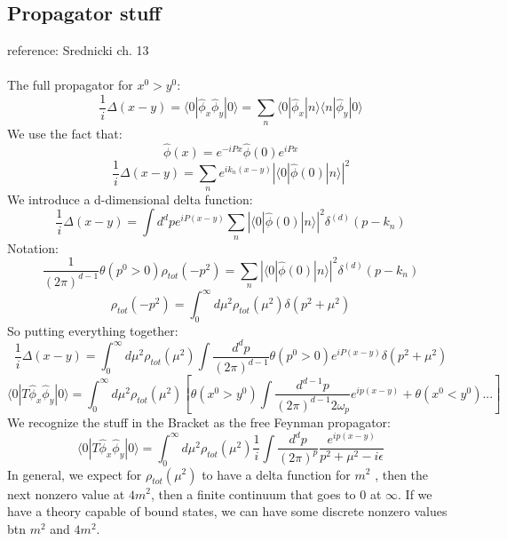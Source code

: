 \documentclass[12 pt]{article}
\begin{document}
\subsection*{Propagator stuff}
reference: Srednicki ch. 13
\\
\\
The full propagator for $x^0>y^0$:
\[  \frac{1}{i}\Delta(x-y) =  \langle 0| \hat \phi_x \hat \phi_y | 0 \rangle = \sum_n \langle 0| \hat \phi_x |n\rangle\langle n|\hat \phi_y |0 \rangle  \]
We use the fact that:
\[ \hat \phi(x) = e^{-iPx} \hat\phi(0) e^{iPx}   \]
\[     \frac{1}{i}\Delta(x-y)  = \sum_{n} e^{ik_n(x-y)} \left|  \langle 0|\hat \phi(0) | n \rangle   \right|^2    \]
We introduce a d-dimensional delta function:
\[    \frac{1}{i}\Delta(x-y)  = \int d^d p e^{iP (x-y)} \sum_n \left|  \langle 0|\hat \phi(0) | n \rangle   \right|^2  \delta^{(d)}(p-k_n)  \]
Notation:
\[  \frac{1}{(2\pi)^{d-1}} \theta(p^0>0)  \rho_{tot} (-p^2) =  \sum_n \left|  \langle 0|\hat \phi(0) | n \rangle   \right|^2  \delta^{(d)}(p-k_n)  \]
\[     \rho_{tot} (-p^2) = \int_0^{\infty} d\mu^2 \rho_{tot}(\mu^2) \delta(p^2+\mu^2)    \]
So putting everything together:
\[    \frac{1}{i}\Delta(x-y)  = \int_0^{\infty} d\mu^2 \rho_{tot}(\mu^2)  \int \frac{d^d p}{(2\pi)^{d-1}}  \theta(p^0>0) e^{iP (x-y)} \delta(p^2+\mu^2)  \]
\[     \langle 0|T \hat \phi_x \hat \phi_y | 0 \rangle =     \int_0^{\infty} d\mu^2 \rho_{tot}(\mu^2) \left[ \theta(x^0 > y^0) \int \frac{d^{d-1} p}{(2\pi)^{d-1} 2\omega_p} e^{ip(x-y)}  +   \theta(x^0 < y^0) ...  \right]   \]
We recognize the stuff in the Bracket as the free Feynman propagator:
\[       \langle 0|T \hat \phi_x \hat \phi_y | 0 \rangle =     \int_0^{\infty} d\mu^2 \rho_{tot}(\mu^2) \frac{1}{i} \int \frac{d^d p}{(2\pi)^p} \frac{e^{ip(x-y)}}{p^2 + \mu^2 - i\epsilon}   \]
In general, we expect for $ \rho_{tot}(\mu^2)$ to have a delta function for $m^2$ , then the next nonzero value at $4m^2$, then a finite continuum that goes to 0 at $\infty$. If we have a theory capable of bound states, we can have some discrete nonzero values btn $m^2$ and $4m^2$.
\end{document}
